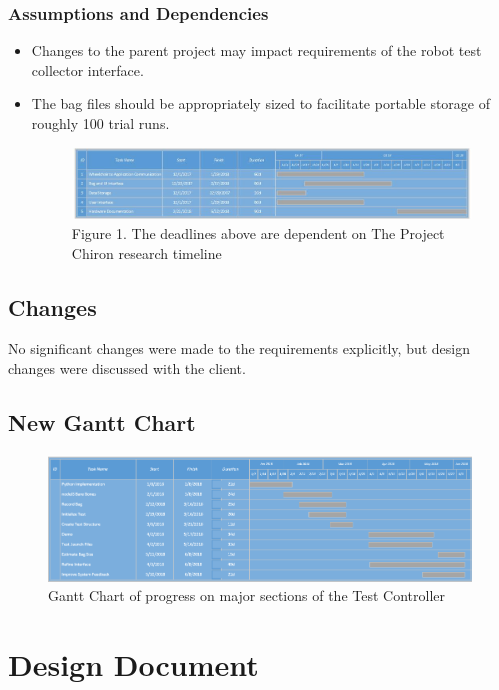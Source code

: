\documentclass[onecolumn, draftclsnofoot,10pt, compsoc]{report}
\begin{document}
	\subsection{Assumptions and Dependencies}
	\begin{itemize}
		\item Changes to the parent project may impact requirements of the robot test collector interface.
		\item The bag files should be appropriately sized to facilitate portable storage of roughly 100 trial runs.
		\begin{figure}[h!]
			
			\centering
			\includegraphics[width=\linewidth, scale=0.7]{PrelimGanttChart.jpg}
			Figure 1. The deadlines above are dependent on The Project Chiron research timeline
		\end{figure}
		
	\end{itemize}
\section{Changes}
No significant changes were made to the requirements explicitly, but design changes were discussed with the client.
	
\section{New Gantt Chart}

\begin{figure}[h]
	\centering
	\includegraphics[width=0.7\linewidth]{"Revised Gantt"}
	\caption{Gantt Chart of progress on major sections of the Test Controller}
	\label{fig:revised-gantt}
\end{figure}


\chapter{Design Document}
\minitoc
\end{document}
